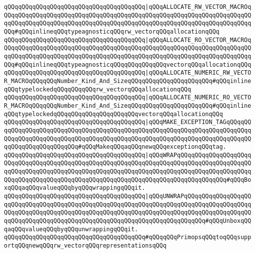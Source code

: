 \newline
\verb|qQQqqQQqqQQqqQQqqQQqqQQqqQQqqQQqqQQqqQQq|\verb#|qQQqALLOCATE_RW_VECTOR_MACROqQQqqQQqqQQqqQQqqQQqqQQqqQQqqQQqqQQqqQQqqQQqqQQqqQQqqQQqqQQqqQQqqQQqqQQqqQQqqQQqqQQqqQQqqQQqqQQqqQQqqQQqqQQqqQQqqQQqqQQqqQQqqQQqqQQqqQQqqQQqqQQq#\verb|#qQQqinlineqQQqtypeagnosticqQQqrw_vectorqQQqallocationqQQq|\newline
\verb|qQQqqQQqqQQqqQQqqQQqqQQqqQQqqQQqqQQqqQQq|\verb#|qQQqALLOCATE_RO_VECTOR_MACROqQQqqQQqqQQqqQQqqQQqqQQqqQQqqQQqqQQqqQQqqQQqqQQqqQQqqQQqqQQqqQQqqQQqqQQqqQQqqQQqqQQqqQQqqQQqqQQqqQQqqQQqqQQqqQQqqQQqqQQqqQQqqQQqqQQqqQQqqQQqqQQq#\verb|#qQQqinlineqQQqtypeagnosticqQQqqQQqqQQqqQQqvectorqQQqallocationqQQq|\newline
\newline
\verb|qQQqqQQqqQQqqQQqqQQqqQQqqQQqqQQqqQQqqQQq|\verb#|qQQqALLOCATE_NUMERIC_RW_VECTOR_MACROqQQqqQQqNumber_Kind_And_SizeqQQqqQQqqQQqqQQqqQQqqQQq#\verb|#qQQqinlineqQQqtypelockedqQQqqQQqqQQqrw_vectorqQQqallocationqQQq|\newline
\verb|qQQqqQQqqQQqqQQqqQQqqQQqqQQqqQQqqQQqqQQq|\verb#|qQQqALLOCATE_NUMERIC_RO_VECTOR_MACROqQQqqQQqNumber_Kind_And_SizeqQQqqQQqqQQqqQQqqQQqqQQq#\verb|#qQQqinlineqQQqtypelockedqQQqqQQqqQQqqQQqqQQqqQQqvectorqQQqallocationqQQq|\newline
\newline
\verb|qQQqqQQqqQQqqQQqqQQqqQQqqQQqqQQqqQQqqQQq|\verb#|qQQqMAKE_EXCEPTION_TAGqQQqqQQqqQQqqQQqqQQqqQQqqQQqqQQqqQQqqQQqqQQqqQQqqQQqqQQqqQQqqQQqqQQqqQQqqQQqqQQqqQQqqQQqqQQqqQQqqQQqqQQqqQQqqQQqqQQqqQQqqQQqqQQqqQQqqQQqqQQqqQQqqQQqqQQqqQQqqQQqqQQqqQQq#\verb|#qQQqMakeqQQqaqQQqnewqQQqexceptionqQQqtag.|\newline
\newline
\verb|qQQqqQQqqQQqqQQqqQQqqQQqqQQqqQQqqQQqqQQq|\verb#|qQQqWRAPqQQqqQQqqQQqqQQqqQQqqQQqqQQqqQQqqQQqqQQqqQQqqQQqqQQqqQQqqQQqqQQqqQQqqQQqqQQqqQQqqQQqqQQqqQQqqQQqqQQqqQQqqQQqqQQqqQQqqQQqqQQqqQQqqQQqqQQqqQQqqQQqqQQqqQQqqQQqqQQqqQQqqQQqqQQqqQQqqQQqqQQqqQQqqQQqqQQqqQQqqQQqqQQqqQQqqQQqqQQqqQQq#\verb|#qQQqBoxqQQqaqQQqvalueqQQqbyqQQqwrappingqQQqit.|\newline
\verb|qQQqqQQqqQQqqQQqqQQqqQQqqQQqqQQqqQQqqQQq|\verb#|qQQqUNWRAPqQQqqQQqqQQqqQQqqQQqqQQqqQQqqQQqqQQqqQQqqQQqqQQqqQQqqQQqqQQqqQQqqQQqqQQqqQQqqQQqqQQqqQQqqQQqqQQqqQQqqQQqqQQqqQQqqQQqqQQqqQQqqQQqqQQqqQQqqQQqqQQqqQQqqQQqqQQqqQQqqQQqqQQqqQQqqQQqqQQqqQQqqQQqqQQqqQQqqQQqqQQqqQQqqQQqqQQq#\verb|#qQQqUnboxqQQqaqQQqvalueqQQqbyqQQqunwrappingqQQqit.|\newline
\newline
\verb|qQQqqQQqqQQqqQQqqQQqqQQqqQQqqQQqqQQqqQQq#qQQqqQQqPrimopsqQQqtoqQQqsupportqQQqnewqQQqrw_vectorqQQqrepresentationsqQQq|\newline
